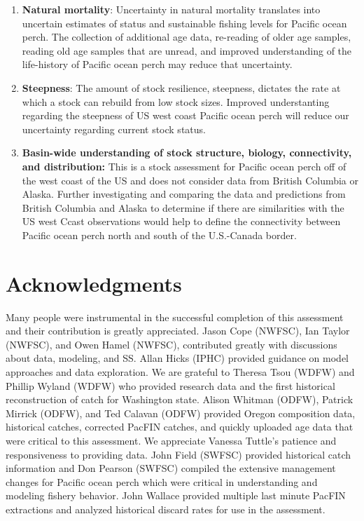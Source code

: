 \documentclass[12pt,]{article}
\begin{document}
\begin{enumerate}

\item \textbf{Natural mortality}: Uncertainty in natural mortality translates into uncertain estimates of status and sustainable fishing levels for Pacific ocean perch. The collection of additional age data, re-reading of older age samples, reading old age samples that are unread, and improved understanding of the life-history of Pacific ocean perch may reduce that uncertainty.

\item \textbf{Steepness}: The amount of stock resilience, steepness, dictates the rate at which a stock can rebuild from low stock sizes.  Improved understanting regarding the steepness of US west coast Pacific ocean perch will reduce our uncertainty regarding current stock status.

\item \textbf{Basin-wide understanding of stock structure, biology, connectivity, and distribution:} This is a stock assessment for Pacific ocean perch off of the west coast of the US and does not consider data from British Columbia or Alaska. Further investigating and comparing the data and predictions from British Columbia and Alaska to determine if there are similarities with the US west Ccast observations would help to define the connectivity between Pacific ocean perch north and south of the U.S.-Canada border.

\end{enumerate}

\section{Acknowledgments}\label{acknowledgments}

Many people were instrumental in the successful completion of this
assessment and their contribution is greatly appreciated. Jason Cope
(NWFSC), Ian Taylor (NWFSC), and Owen Hamel (NWFSC), contributed greatly
with discussions about data, modeling, and SS. Allan Hicks (IPHC)
provided guidance on model approaches and data exploration. We are
grateful to Theresa Tsou (WDFW) and Phillip Wyland (WDFW) who provided
research data and the first historical reconstruction of catch for
Washington state. Alison Whitman (ODFW), Patrick Mirrick (ODFW), and Ted
Calavan (ODFW) provided Oregon composition data, historical catches,
corrected PacFIN catches, and quickly uploaded age data that were
critical to this assessment. We appreciate Vanessa Tuttle's patience and
responsiveness to providing data. John Field (SWFSC) provided historical
catch information and Don Pearson (SWFSC) compiled the extensive
management changes for Pacific ocean perch which were critical in
understanding and modeling fishery behavior. John Wallace provided
multiple last minute PacFIN extractions and analyzed historical discard
rates for use in the assessment.
\end{document}
